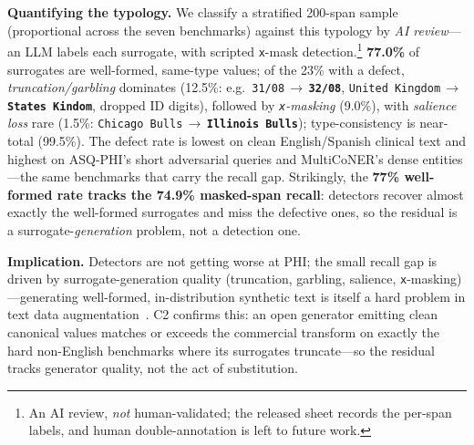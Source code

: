 \documentclass[11pt]{article}
\newcommand{\oldv}[1]{\textcolor{cclay}{#1}}
\newcommand{\newv}[1]{\textcolor{caccent}{\textbf{#1}}}
\newcommand{\arr}{\,$\rightarrow$\,\allowbreak}
\newcommand{\tp}[1]{\texttt{#1}}
\begin{document}
\textbf{Quantifying the typology.} We classify a stratified 200-span sample (proportional across the seven benchmarks) against this typology by \emph{AI review}---an LLM labels each surrogate, with scripted \tp{x}-mask detection.\footnote{An AI review, \emph{not} human-validated; the released sheet records the per-span labels, and human double-annotation is left to future work.} \textbf{77.0\%} of surrogates are well-formed, same-type values; of the 23\% with a defect, \emph{truncation/garbling} dominates (12.5\%: e.g.\ \oldv{\tp{31/08}}\arr\newv{\tp{32/08}}, \oldv{\tp{United Kingdom}}\arr\newv{\tp{States Kindom}}, dropped ID digits), followed by \emph{\tp{x}-masking} (9.0\%), with \emph{salience loss} rare (1.5\%: \oldv{\tp{Chicago Bulls}}\arr\newv{\tp{Illinois Bulls}}); type-consistency is near-total (99.5\%). The defect rate is lowest on clean English/Spanish clinical text and highest on ASQ-PHI's short adversarial queries and MultiCoNER's dense entities---the same benchmarks that carry the recall gap. Strikingly, the \textbf{77\% well-formed rate tracks the 74.9\% masked-span recall}: detectors recover almost exactly the well-formed surrogates and miss the defective ones, so the residual is a surrogate-\emph{generation} problem, not a detection one.

\textbf{Implication.} Detectors are not getting worse at PHI; the small recall gap is driven by surrogate-generation quality (truncation, garbling, salience, \tp{x}-masking)---generating well-formed, in-distribution synthetic text is itself a hard problem in text data augmentation~\citep{bao2024amr}. C2 confirms this: an open generator emitting clean canonical values matches or exceeds the commercial transform on exactly the hard non-English benchmarks where its surrogates truncate---so the residual tracks generator quality, not the act of substitution.
\end{document}
